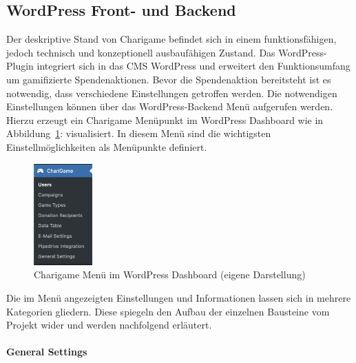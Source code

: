 \subsection{WordPress Front- und Backend}
\label{subsec:front-backend}
Der deskriptive Stand von Charigame befindet sich in einem funktionsfähigen, jedoch technisch und konzeptionell ausbaufähigen Zustand.
Das WordPress-Plugin integriert sich in das CMS WordPress und erweitert den Funktionsumfang um gamifizierte Spendenaktionen.
Bevor die Spendenaktion bereitsteht ist es notwendig, dass verschiedene Einstellungen getroffen werden.
Die notwendigen Einstellungen können über das WordPress-Backend Menü aufgerufen werden.
\\
Hierzu erzeugt ein Charigame Menüpunkt im WordPress Dashboard wie in Abbildung~\ref{fig:charigame-menu-legacy}: visualisiert.
In diesem Menü sind die wichtigsten Einstellmöglichkeiten als Menüpunkte definiert.
\begin{figure}[tbh]
    \centering
    \includegraphics[width=0.2\textwidth]{images/legacy_charigame_wordpress_menu}
    \caption{Charigame Menü im WordPress Dashboard (eigene Darstellung)}
    \label{fig:charigame-menu-legacy}
\end{figure}

Die im Menü angezeigten Einstellungen und Informationen lassen sich in mehrere Kategorien gliedern.
Diese spiegeln den Aufbau der einzelnen Bausteine vom Projekt wider und werden nachfolgend erläutert.
\\\\
\textbf{General Settings}

